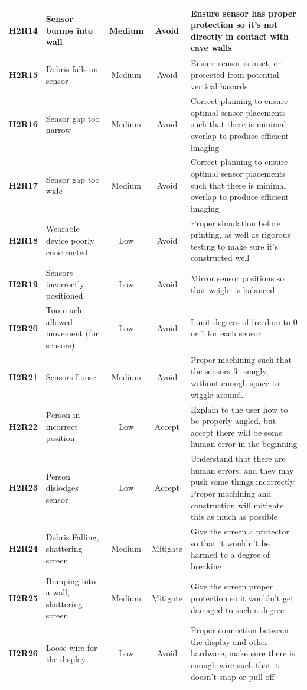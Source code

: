 \documentclass[11pt]{article}
\begin{document}
\begin{tabularx}{\textwidth}{ c  p{}  c  c  X }
				\hline
				\textbf{H2R14} & Sensor bumps into wall & Medium  & Avoid  & Ensure sensor has proper protection so it's not directly in contact with cave walls \\ 
				\hline
				\textbf{H2R15} & Debris falls on sensor & Medium  & Avoid  & Ensure sensor is inset, or protected from potential vertical hazards \\ 
				\hline
				\textbf{H2R16} & Sensor gap too narrow & Medium  & Avoid & Correct planning to ensure optimal sensor placements such that there is minimal overlap to produce efficient imaging\\ 
				\hline
				\textbf{H2R17} & Sensor gap too wide & Medium  & Avoid  &  Correct planning to ensure optimal sensor placements such that there is minimal overlap to produce efficient imaging\\ 
				\hline
				\textbf{H2R18} & Wearable device poorly constructed & Low  & Avoid  & Proper simulation before printing, as well as rigorous testing to make sure it's constructed well \\ 
				\hline
				\textbf{H2R19} & Sensors incorrectly positioned & Low  & Avoid  &  Mirror sensor positions so that weight is balanced\\ 
				\hline
				\textbf{H2R20} & Too much allowed movement (for sensors) & Low & Avoid  & Limit degrees of freedom to 0 or 1 for each sensor \\ 
				\hline
				\textbf{H2R21} & Sensors Loose & Medium  & Avoid  & Proper machining such that the sensors fit snugly, without enough space to wiggle around. \\ 
				\hline
				\textbf{H2R22} & Person in incorrect position & Low  & Accept  & Explain to the user how to be properly angled, but accept there will be some human error in the beginning \\ 
				\hline
				\textbf{H2R23} & Person dislodges sensor & Low & Accept & Understand that there are human errors, and they may push some things incorrectly. Proper machining and construction will mitigate this as much as possible\\ 
				\hline
				\textbf{H2R24} & Debris Falling, shattering screen & Medium  & Mitigate & Give the screen a protector so that it wouldn't be harmed to a degree of breaking\\ 
				\hline
				\textbf{H2R25} & Bumping into a wall, shattering screen & Medium  & Mitigate & Give the screen proper protection so it wouldn't get damaged to such a degree  \\ 
				\hline
				\textbf{H2R26} & Loose wire for the display & Low  & Avoid  & Proper connection between the display and other hardware, make sure there is enough wire such that it doesn't snap or pull off \\ 

\end{tabularx}
\end{document}
